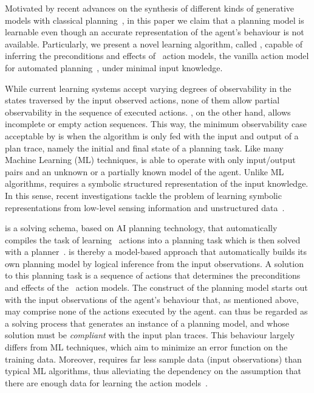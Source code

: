 Motivated by recent advances on the synthesis of different kinds of generative models with classical planning~\cite{bonet2009automatic,segovia2016generalized,segovia2016hierarchical,segovia2017generating}, in this paper we claim that a planning model is learnable even though an accurate representation of the agent's behaviour is not available. Particularly, we present a novel learning algorithm, called \FAMA, capable of inferring the preconditions and effects of \strips\ action models, the vanilla action model for automated planning~\cite{fikes1971strips}, under minimal input knowledge.

While current learning systems accept varying degrees of observability in the states traversed by the input observed actions, none of them allow partial observability in the sequence of executed actions. \FAMA, on the other hand, allows incomplete or empty action sequences. This way, the minimum observability case acceptable by \FAMA is when the algorithm is only fed with the input and output of a plan trace, namely the initial and final state of a planning task. Like many Machine Learning (ML) techniques, \FAMA is able to operate with only input/output pairs and an unknown or a partially known model of the agent. Unlike ML algorithms, \FAMA requires a symbolic structured representation of the input knowledge. In this sense, recent investigations tackle the problem of learning symbolic representations from low-level sensing information and unstructured data~\cite{KonidarisKL18,AsaiF18}.

\FAMA is a solving schema, based on AI planning technology, that automatically compiles the task of learning \strips\ actions into a planning task which is then solved with a planner~\cite{aineto2018learning}. \FAMA is thereby a model-based approach that automatically builds its own planning model by logical inference from the input observations. A solution to this planning task is a sequence of actions that determines the preconditions and effects of the \strips\ action models. The construct of the planning model starts out with the input observations of the agent's behaviour that, as mentioned above, may comprise none of the actions executed by the agent. \FAMA can thus be regarded as a solving process that generates an instance of a planning model, and whose solution must be \emph{compliant} with the input plan traces. This behaviour largely differs from ML techniques, which aim to minimize an error function on the training data. Moreover, \FAMA requires far less sample data (input observations) than typical ML algorithms, thus alleviating the dependency on the assumption that there are enough data for learning the action models~\cite{Zhuo15}.

